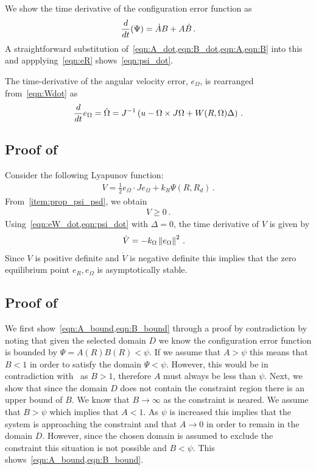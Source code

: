 \documentclass[letterpaper, 10 pt, conference]{ieeeconf}  %
\begin{document}
We show the time derivative of the configuration error function as
\begin{gather*}
	\frac{d }{d t} (\Psi) = \dot{A} B + A \dot{B} \, .
\end{gather*}
A straightforward substitution of~\cref{eqn:A_dot,eqn:B_dot,eqn:A,eqn:B} into this and appplying~\cref{eqn:eR} shows~\cref{eqn:psi_dot}.

The time-derivative of the angular velocity error, \( e_\Omega \), is rearranged from~\cref{eqn:Wdot} as 
\begin{align*}
	\frac{d }{d t} e_\Omega = \dot{\Omega} = J^{-1} \left( u - \Omega \times J \Omega + W(R,\Omega) \Delta  \right) \, .
\end{align*}
\subsection{Proof of~}\label{proof:att_control}
	Consider the following Lyapunov function:
	\begin{gather}
		V = \frac{1}{2} e_\Omega \cdot J e_\Omega + k_R \Psi(R,R_d) \, . \label{eqn:v_nodist}
	\end{gather}
	From~\cref{item:prop_psi_psd}, we obtain
	\begin{gather*}
		V \geq 0 \, .
	\end{gather*}
	Using~\cref{eqn:eW_dot,eqn:psi_dot} with \( \Delta = 0 \), the time derivative of \( V \) is given by
	\begin{align}
		\dot{V} &= -k_\Omega \left\| e_\Omega \right\|^2 \, . \label{eqn:vdot_nodist}
	\end{align}
	Since \( V \) is positive definite and \( \dot{V} \) is negative definite this implies that the zero equilibrium point \( e_R, e_\Omega \) is asymptotically stable.
	
\subsection{Proof of~}\label{proof:eR_dot_bound}
	We first show~\cref{eqn:A_bound,eqn:B_bound} through a proof by contradiction by noting that given the selected domain \( D \) we know the configuration error function is bounded by \( \Psi = A(R) B(R) < \psi\).
	If we assume that \( A > \psi \) this means that \( B < 1 \) in order to satisfy the domain \( \Psi < \psi \).
	However, this would be in contradiction with~ as \( B > 1 \), therefore \( A \) must always be less than \( \psi \).
	Next, we show that since the domain \( D \) does not contain the constraint region there is an upper bound of \(B\).
	We know that \( B \to \infty \) as the constraint is neared. 
	We assume that \( B > \psi \) which implies that \( A < 1 \).
	As \( \psi \) is increased this implies that the system is approaching the constraint and that \( A \to 0 \) in order to remain in the domain \( D \).
	However, since the chosen domain is assumed to exclude the constraint this situation is not possible and \( B < \psi \).
	This shows~\cref{eqn:A_bound,eqn:B_bound}.
	
\end{document}

